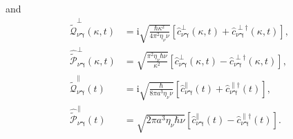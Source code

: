\documentclass{article}
\begin{document}
and
\begin{equation}
\begin{split}
\hat{\tilde{\mathcal{Q}}}_{\nu\bm{\gamma}}^\perp(\kappa,t) &= \mathrm{i}\sqrt{\frac{\hbar\kappa^2}{4\pi^2\eta_\nu\nu}}\left[\hat{c}_{\nu\bm{\gamma}}^{\perp}(\kappa,t) + \hat{c}_{\nu\bm{\gamma}}^{\perp\dagger}(\kappa,t)\right],\\
\hat{\tilde{\mathcal{P}}}_{\nu\bm{\gamma}}^\perp(\kappa,t) &= \sqrt{\frac{\pi^2\eta_\nu\hbar\nu}{\kappa^2}}\left[\hat{c}_{\nu\bm{\gamma}}^\perp(\kappa,t) - \hat{c}_{\nu\bm{\gamma}}^{\perp\dagger}(\kappa,t)\right],\\[0.5em]
\hat{\tilde{\mathcal{Q}}}_{\nu\bm{\gamma}}^\parallel(t) &= \mathrm{i}\sqrt{\frac{\hbar}{8\pi a^3\eta_\nu\nu}}\left[\hat{c}_{\nu\bm{\gamma}}^\parallel(t) + \hat{c}_{\nu\bm{\gamma}}^{\parallel\dagger}(t)\right],\\
\hat{\tilde{\mathcal{P}}}_{\nu\bm{\gamma}}^\parallel(t) &= \sqrt{2\pi a^3\eta_\nu\hbar\nu}\left[\hat{c}_{\nu\bm{\gamma}}^\parallel(t) - \hat{c}_{\nu\bm{\gamma}}^{\parallel\dagger}(t)\right].
\end{split}
\end{equation}
\end{document}
